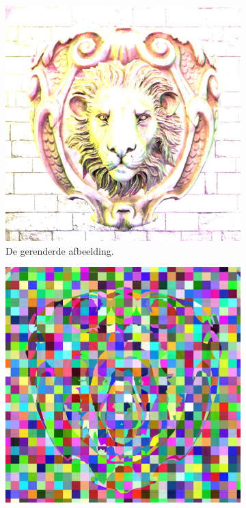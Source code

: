 \begin{figure}
  \centering
  \begin{subfigure}[b]{0.32\textwidth}
    \includegraphics[width=\textwidth]{./img/raw/cs-opdeling-voorbeeld/render.png}
    \caption{De gerenderde afbeelding.}
    \label{fig:cs-opdeling-voorbeeld:render}
  \end{subfigure}%
  \begin{subfigure}[b]{0.32\textwidth}
    \includegraphics[width=\textwidth]{./img/raw/cs-opdeling-voorbeeld/depth.png}

\end{subfigure}
\end{figure}

